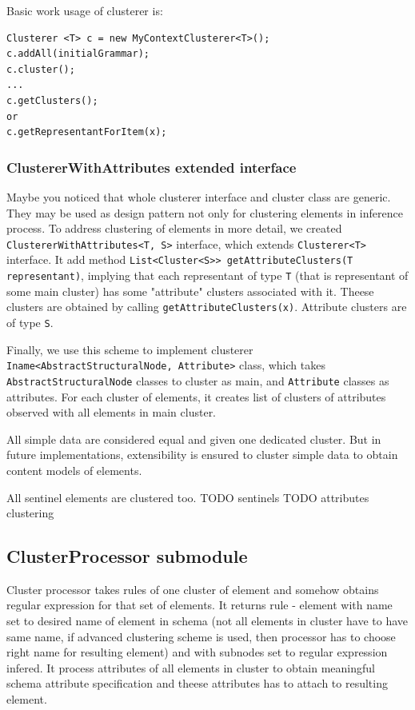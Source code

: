 \documentclass[a4paper,10pt,oneside]{article}
\newcommand{\code}[1]{\texttt{#1}}
\begin{document}
Basic work usage of clusterer is:
\begin{verbatim}
Clusterer <T> c = new MyContextClusterer<T>();
c.addAll(initialGrammar);
c.cluster();
...
c.getClusters();
or
c.getRepresentantForItem(x);
\end{verbatim}

\subsubsection{ClustererWithAttributes extended interface}
Maybe you noticed that whole clusterer interface and cluster class are generic.
They may be used as design pattern not only for clustering elements in inference process.
To address clustering of elements in more detail, we created \code{ClustererWithAttributes<T, S>} interface, which extends \code{Clusterer<T>} interface.
It add method \code{List<Cluster<S>> getAttributeClusters(T representant)}, implying that each representant of
type \code{T} (that is representant of some main cluster) has some "attribute" clusters associated with it.
Theese clusters are obtained by calling \code{getAttributeClusters(x)}.
Attribute clusters are of type \code{S}.

Finally, we use this scheme to implement clusterer \code{Iname<AbstractStructuralNode, Attribute>} class, which takes \code{AbstractStructuralNode} classes to cluster as main, and \code{Attribute} classes as attributes.
For each cluster of elements, it creates list of clusters of attributes observed with all elements in main cluster.

All simple data are considered equal and given one dedicated cluster.
But in future implementations, extensibility is ensured to cluster simple data to obtain content models of elements.

All sentinel elements are clustered too.
TODO sentinels
TODO attributes clustering

\subsection{ClusterProcessor submodule}
Cluster processor takes rules of one cluster of element and somehow obtains regular expression for that set of elements. It returns rule - element with name set to desired name of element in schema (not all elements in cluster have to have same name, if advanced clustering scheme is used, then processor has to choose right name for  resulting element) and with subnodes set to regular expression infered.
It process attributes of all elements in cluster to obtain meaningful schema attribute specification and theese attributes has to attach to resulting element.
\end{document}
